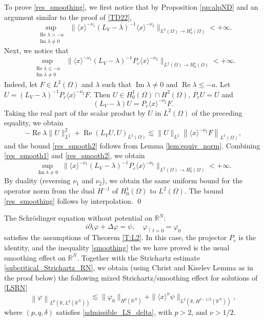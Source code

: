\documentclass[10pt,leqno]{amsart}
\DeclareMathOperator{\im}{Im} %
\DeclareMathOperator{\re}{Re} %
\theoremstyle{definition}%
\theoremstyle{remark}
\numberwithin{equation}{section}
\newcommand{\R}{\mathbb{R}}
\renewcommand{\^}{\widehat}%
\newcommand{\la}{\langle}
\newcommand{\ra}{\rangle}
\begin{document}
 To prove \eqref{res_smoothing}, we first notice that by Proposition \ref{pp:alpND} and an argument similar to the proof of \eqref{TD22},
\begin{equation}
\label{res_smooth1}
	\sup_{\substack{\re \lambda>-a\\ \im \lambda\neq 0}}
	\;	\|\langle x\rangle^{-\nu_1}
	(L_V-\lambda)^{-1}\langle x\rangle^{-\nu_2}\|_{L^2(\Omega)\to H^{1}_0(\Omega)}<+\infty. 
\end{equation} 
Next, we notice that 
\begin{equation}
 \label{res_smooth2}
	\sup_{\substack{\re \lambda\leq -a\\ \im \lambda\neq 0}}
	\;	\|\langle x\rangle^{-\nu_1}
	(L_V-\lambda)^{-1}P_c\langle x\rangle^{-\nu_2}\|_{L^2(\Omega)\to H^{1}_0(\Omega)}<+\infty.
\end{equation} 
Indeed, let $F\in L^2(\Omega)$ and $\lambda$ such that $\im \lambda\neq 0$ and $\re\lambda\leq -a$. Let $U=(L_V-\lambda)^{-1}P_c \la x\ra^{-\nu_2}F$. Then $U\in H^1_0(\Omega)\cap H^2(\Omega)$, $P_cU=U$ and
$$ (L_V-\lambda) U=P_c \la x\ra^{-\nu_2}F.$$
Taking the real part of the scalar product by $U$ in $L^{2}(\Omega)$ of the preceding equality, we obtain
$$ -\re \lambda\|U\|_{L^2}^2+\re (L_VU,U)_{L^2(\Omega)} \lesssim \|U\|_{L^2}\left\| \la x\ra^{-\nu_2} F\right\|_{L^2(\Omega)},$$
and the bound \eqref{res_smooth2} follows from Lemma \ref{lem:equiv_norm}. Combining \eqref{res_smooth1} and \eqref{res_smooth2}, we obtain 
\begin{equation*}
	\sup_{\im \lambda\neq 0}
	\;	\|\langle x\rangle^{-\nu_1}
	(L_V-\lambda)^{-1}P_c \langle x\rangle^{-\nu_2}\|_{L^2(\Omega)\to H^{1}_0(\Omega)}<+\infty. 
\end{equation*}
By duality (reversing $\nu_1$ and $\nu_2$), we obtain the same uniform bound for the operator norm from the dual $H^{-1}$ of $H^{1}_0(\Omega)$ to $L^2(\Omega)$. The bound \eqref{res_smoothing} follows by interpolation. \qed

The Schr\"odinger equation without potential on $\R^N$: 
\begin{equation}
 \label{LSRN}
 i\partial_t\varphi+\Delta \varphi=\psi, \quad \varphi_{\restriction t=0}=\varphi_0
\end{equation} 
satisfies the assumptions of Theorem \ref{T:L2}.
In this case, the projector $P_c$ is the identity, and the inequality \eqref{smoothing} the we have proved is the usual smoothing effect on $\R^N$. Together with the Strichartz estimate \eqref{subcritical_Strichartz_RN}, we obtain (using Christ and Kiselev Lemma as in the proof below) the following mixed Strichartz/smoothing effect for solutions of \eqref{LSRN}
\begin{equation}
 \label{mixteRN}
\left\| \varphi\right\|_{L^{p}(\R,L^q(\R^N))}\lesssim \|\varphi_0\|_{H^{\delta}(\R^N)}+\|\la x\ra^{\nu} \psi\|_{L^2(\R,H^{\delta-1/2}(\R^N))},
\end{equation}
where $(p,q,\delta)$ satisfies \eqref{admissible_LS_delta}, with $p>2$, and $\nu>1/2$.
\end{document}
